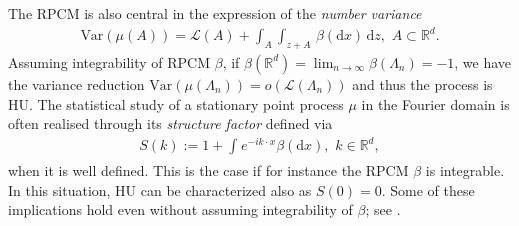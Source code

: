 \documentclass[12pt]{article}
\newcommand{\R}{\mathbb{R}}
\newcommand{\Leb}{\mathcal{L}}
\newcommand{\br}{\beta}%
\newcommand{\1}{\mathbf{1}}
\newcommand{\md}{\mathrm{d}}
\newcommand{\var}{\text{Var}}
\begin{document}
{{The RPCM  is also central in the expression of the  {\it number variance }
%
\begin{align}
\label{e:variance_expression}
\var(\mu (A)) = \Leb(A) + \int_{A}\int_{z + A}\, \beta (\md x)\, \md z, \, \, A\subset \mathbb{R}^{d}.
\end{align}
%
 {Assuming integrability of RPCM $\beta$, if $\beta(\R^d) = \lim_{n\to \infty }\beta (\Lambda _{n}) = -1$, we have the variance reduction $ \var(\mu (\Lambda _{n})) = o(\Leb(\Lambda _{n}))$ and thus the process is HU.} The statistical study of a stationary point process $ \mu $ in the Fourier domain is often realised through its  {\it structure factor} defined via
%
\begin{align}
\label{e:structfact}
S(k) := 1 +\int_{}e^{-ik\cdot x}\br(\md x), \, \, k \in \R^d,
\end{align}
%
when it is well defined. This is the case if for instance the RPCM  $\beta$ is integrable. In this situation, HU can be characterized also as $S(0) = 0 $. {Some of these implications hold even without assuming integrability of $\beta$; see \cite[Theorem 3.6]{bjorklund2023hyperuniformity}.}


}}
\end{document}
